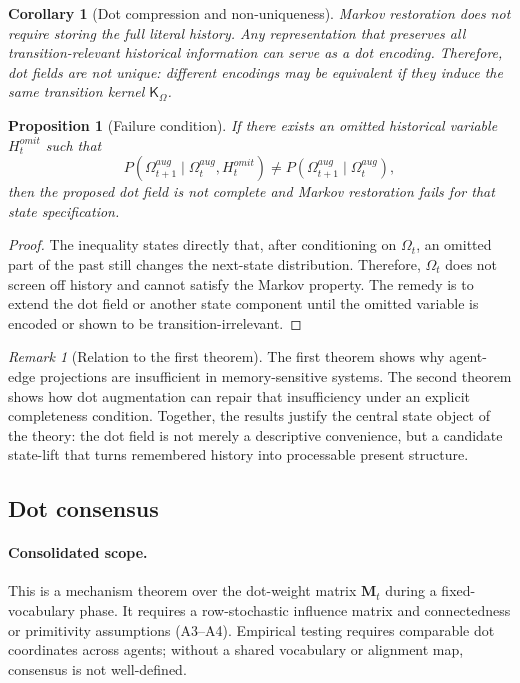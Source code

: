 \documentclass[11pt]{article}
\newtheorem{proposition}{Proposition}
\newtheorem{corollary}{Corollary}
\theoremstyle{remark}
\newtheorem{remark}{Remark}
\begin{document}
\begin{corollary}[Dot compression and non-uniqueness]
Markov restoration does not require storing the full literal history.
Any representation that preserves all transition-relevant historical
information can serve as a dot encoding. Therefore, dot fields are not
unique: different encodings may be equivalent if they induce the same
transition kernel $\mathsf{K}_\Omega$.
\end{corollary}


\begin{proposition}[Failure condition]
If there exists an omitted historical variable $H_t^{omit}$ such that
$$
P(\Omega_{t+1}^{aug}\mid \Omega_t^{aug},H_t^{omit})\neq P(\Omega_{t+1}^{aug}\mid \Omega_t^{aug}),
$$
then the proposed dot field is not complete and Markov restoration
fails for that state specification.
\end{proposition}

\begin{proof}
The inequality states directly that, after conditioning on $\Omega_t$,
an omitted part of the past still changes the next-state distribution.
Therefore, $\Omega_t$ does not screen off history and cannot satisfy the
Markov property. The remedy is to extend the dot field or another state
component until the omitted variable is encoded or shown to be
transition-irrelevant.
\end{proof}

\begin{remark}[Relation to the first theorem]
The first theorem shows why agent-edge projections are insufficient in
memory-sensitive systems. The second theorem shows how dot augmentation
can repair that insufficiency under an explicit completeness condition.
Together, the results justify the central state object of the theory:
the dot field is not merely a descriptive convenience, but a candidate
state-lift that turns remembered history into processable present
structure.
\end{remark}

\subsection{Dot consensus}\label{dot-consensus}

\paragraph{Consolidated scope.} This is a mechanism theorem over the dot-weight matrix $\mathbf M_t$ during a fixed-vocabulary phase. It requires a row-stochastic influence matrix and connectedness or primitivity assumptions (A3--A4). Empirical testing requires comparable dot coordinates across agents; without a shared vocabulary or alignment map, consensus is not well-defined.
\end{document}
